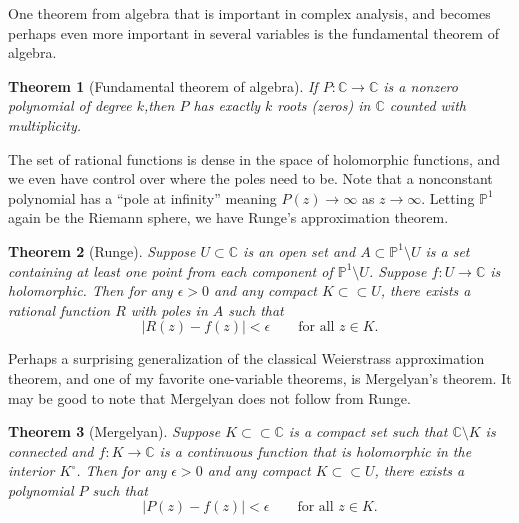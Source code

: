\documentclass[12pt,openany]{book}
\newcommand{\sabs}[1]{\lvert {#1} \rvert}
\newcommand{\C}{{\mathbb{C}}}
\newcommand{\bP}{{\mathbb{P}}}
\theoremstyle{plain}
\newtheorem{thm}{Theorem}[section]
\theoremstyle{remark}
\theoremstyle{definition}
\theoremstyle{exercise}
\theoremstyle{example}
\begin{document}
One theorem from algebra that is important in complex analysis, and becomes
perhaps even more important in several variables is the fundamental theorem
of algebra.

\begin{thm}[Fundamental theorem of algebra]
If $P \colon \C \to \C$ is a nonzero polynomial of degree $k$,\linebreak[2]
then $P$
has exactly $k$ roots (zeros) in $\C$ counted with multiplicity.
\end{thm}

The set of rational functions is dense in the space of holomorphic
functions, and we even have control over where the poles need to be.
Note that a nonconstant polynomial has a ``pole at infinity'' meaning 
$P(z) \to \infty$ as $z \to \infty$.  Letting $\bP^1$ again be the Riemann
sphere, we have Runge's approximation theorem.

\begin{thm}[Runge]
Suppose $U \subset \C$ is an open set and $A \subset \bP^1 \setminus U$
is a set containing at least one point from each component of
$\bP^1 \setminus U$.  Suppose $f \colon U \to \C$ is holomorphic.
Then for any $\epsilon > 0$ and any compact
$K \subset \subset U$, there exists a rational function $R$ with poles in $A$
such that
\begin{equation*}
\sabs{R(z) - f(z)} < \epsilon \qquad \text{for all $z \in K$}.
\end{equation*}
\end{thm}

Perhaps a surprising generalization of the
classical Weierstrass approximation theorem,
and one of my favorite one-variable theorems,
is Mergelyan's theorem.
It may be good to note that Mergelyan does not follow from Runge.

\begin{thm}[Mergelyan] \label{thm:mergelyan}
Suppose $K \subset \subset \C$ is a compact set such that $\C \setminus K$
is connected and
$f \colon K \to \C$ is a continuous function that is
holomorphic in the interior $K^\circ$.
Then for any $\epsilon > 0$ and any compact
$K \subset \subset U$, there exists a polynomial $P$
such that
\begin{equation*}
\sabs{P(z) - f(z)} < \epsilon \qquad \text{for all $z \in K$}.
\end{equation*}
\end{thm}
\end{document}
